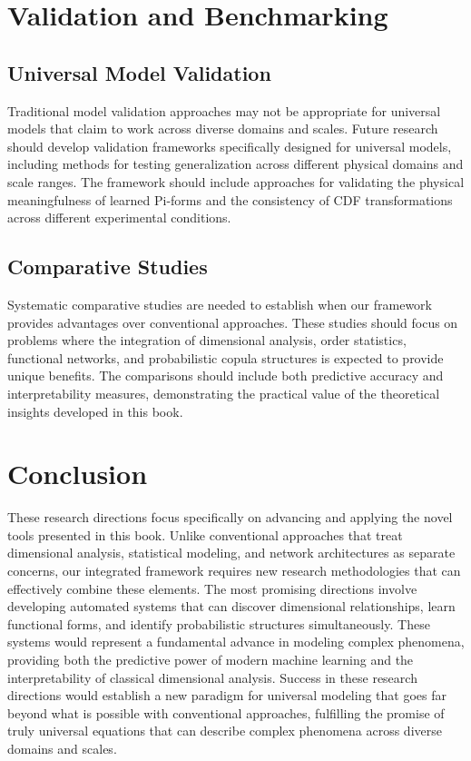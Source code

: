 \documentclass[
	11pt, %
	fleqn, %
	a4paper, %
]{LegrandOrangeBook}
\begin{document}
\section{Validation and Benchmarking}
\subsection{Universal Model Validation}
Traditional model validation approaches may not be appropriate for universal models that claim to work across diverse domains and scales. Future research should develop validation frameworks specifically designed for universal models, including methods for testing generalization across different physical domains and scale ranges.
The framework should include approaches for validating the physical meaningfulness of learned Pi-forms and the consistency of CDF transformations across different experimental conditions.

\subsection{Comparative Studies}
Systematic comparative studies are needed to establish when our framework provides advantages over conventional approaches. These studies should focus on problems where the integration of dimensional analysis, order statistics, functional networks, and probabilistic copula structures is expected to provide unique benefits.
The comparisons should include both predictive accuracy and interpretability measures, demonstrating the practical value of the theoretical insights developed in this book.

\section{Conclusion}
These research directions focus specifically on advancing and applying the novel tools presented in this book. Unlike conventional approaches that treat dimensional analysis, statistical modeling, and network architectures as separate concerns, our integrated framework requires new research methodologies that can effectively combine these elements.
The most promising directions involve developing automated systems that can discover dimensional relationships, learn functional forms, and identify probabilistic structures simultaneously. These systems would represent a fundamental advance in modeling complex phenomena, providing both the predictive power of modern machine learning and the interpretability of classical dimensional analysis.
Success in these research directions would establish a new paradigm for universal modeling that goes far beyond what is possible with conventional approaches, fulfilling the promise of truly universal equations that can describe complex phenomena across diverse domains and scales.
\end{document}
